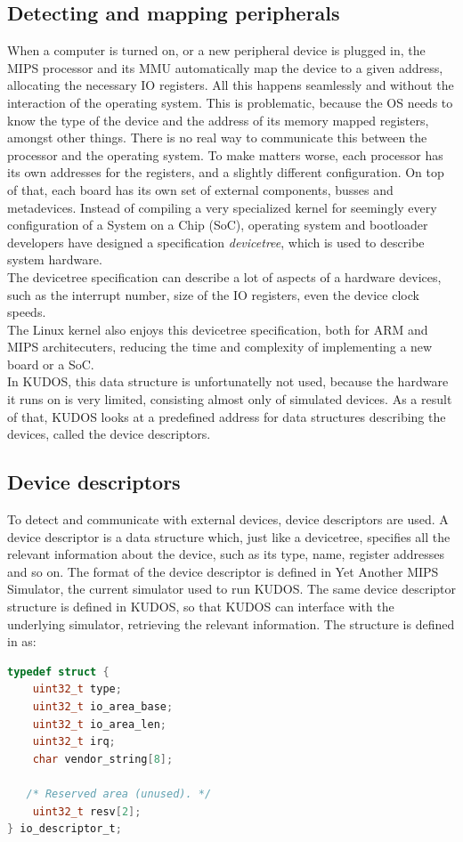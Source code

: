 \subsection{Detecting and mapping peripherals}
When a computer is turned on, or a new peripheral device is plugged in, the MIPS
processor and its MMU automatically map the device to a given address, allocating
the necessary IO registers. All this happens seamlessly and without the interaction
of the operating system. This is problematic, because the OS needs to know the
type of the device and the address of its memory mapped registers, amongst other
things. There is no real way to communicate this between the processor and the
operating system. To make matters worse, each processor has its own addresses
for the registers, and a slightly different configuration. On top of that, each
board has its own set of external components, busses and metadevices\cite{devicetree_spec}\cite{xillybus:devicetree}.
Instead of compiling a very specialized kernel for seemingly every configuration
of a System on a Chip (SoC), operating system and bootloader developers have
designed a specification \emph{devicetree}, which is used to describe system
hardware\cite{devicetree_spec}.\\
The devicetree specification can describe a lot of aspects of a hardware devices,
such as the interrupt number, size of the IO registers, even the device clock
speeds.\\
The Linux kernel also enjoys this devicetree specification, both for ARM and
MIPS architecuters\cite[\texttt{linux-4.6/arch/mips/boot/dts}]{linux}, reducing the time
and complexity of implementing a new board or a SoC.\\
In KUDOS, this data structure is unfortunatelly not used, because the hardware
it runs on is very limited, consisting almost only of simulated devices. As
a result of that, KUDOS looks at a predefined address for data structures
describing the devices, called the device descriptors.

\subsection{Device descriptors}
To detect and communicate with external devices, device descriptors are used.
A device descriptor is a data structure which, just like a devicetree, specifies
all the relevant information about the device, such as its type, name, register
addresses and so on. The format of the device descriptor is defined in Yet Another
MIPS Simulator, the current simulator used to run KUDOS. The same device descriptor
structure is defined in KUDOS, so that KUDOS can interface with the underlying
simulator, retrieving the relevant information.
The structure is defined in \cite[kudos/drivers/mips32/arch.h]{kudos} as:
\begin{lstlisting}[language=c]
typedef struct {
    uint32_t type;
    uint32_t io_area_base;
    uint32_t io_area_len;
    uint32_t irq;
    char vendor_string[8];

   /* Reserved area (unused). */
    uint32_t resv[2];
} io_descriptor_t;
\end{lstlisting}

